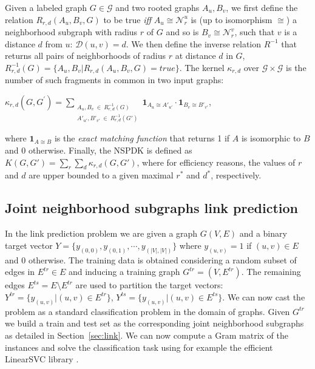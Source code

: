 \documentclass[runningheads,a4paper]{llncs}
\begin{document}
Given a labeled graph $G \in \mathcal{G}$ and two rooted graphs $A_u, B_v$, we first define the relation $R_{r,d}(A_u, B_v, G)$ to be true {\em iff} $A_u \cong \mathcal{N}_r^u$ is (up to isomorphism $\cong$) a neighborhood subgraph with radius $r$ of $G$ and so is $B_v \cong  \mathcal{N}_r^v$, such that $v$ is a distance $d$ from $u$: $\mathcal{D}(u,v)= d$. We then define the inverse relation $R^{-1}$ that returns all pairs of neighborhoods of radius $r$ at distance $d$ in $G$, $R^{-1}_{r,d}(G) = \lbrace A_u, B_v | R_{r,d}(A_u,B_v,G)=true\rbrace$. The kernel $\kappa_{r,d}$ over $\mathcal{G} \times \mathcal{G}$ is the number of such fragments in common in two input graphs:
\begin{center}
$\kappa_{r,d}(G,G^{'}) = 
\!\!\!\!\!\!\!\!\!\!\!\! 
\sum\limits_{\substack{A_u, B_v \ \in \ R_{r,d}^{-1}(G) \\ 
{A'}_{u'}, {B'}_{v'} \ \in \ R_{r,d}^{-1}(G')
}} \!\!\!\!\!\!\!\!\!\!\!\!  { { \textbf{1}_{A_{u} \cong A'_{u'}}} \cdot {
\textbf{1}_{B_{v} \cong B'_{v'}}} }$, 
\end{center}
\noindent where $\textbf{1}_{A \cong B}$ is the \textit{exact matching function} that returns 1 if $A$ is isomorphic to $B$ and 0 otherwise. Finally, the NSPDK is defined as $K(G,G') = \sum\limits_{r}{\sum\limits_{d}{\kappa_{r,d}(G,G')}}$, where for efficiency reasons, the values of $r$ and $d$ are upper bounded to a given maximal $r^*$ and $d^*$, respectively.


\subsection{Joint neighborhood subgraphs link prediction}

In the link prediction problem we are given a graph $G(V,E)$ and a binary target vector $Y=\{y_{(0,0)},y_{(0,1)}, \cdots, y_{(|V|,|V|)}\}$ where $y_{(u,v)}=1$ if $(u,v) \in E$ and 0 otherwise. The training data is obtained considering a random subset of edges in $E^{tr} \in E$ and inducing a training graph $G^{tr}=(V,E^{tr})$. The remaining edges $E^{ts} = E \setminus E^{tr}$ are used to partition the target vectors: $Y^{tr} = \{y_{(u,v)} | (u,v) \in E^{tr}\}$, $Y^{ts} = \{y_{(u,v)} | (u,v) \in E^{ts}\}$.
We can now cast the problem as a standard classification problem in the domain of graphs. Given $G^{tr}$ we build a train and test set as the corresponding joint neighborhood subgraphs as detailed in Section~\ref{sec:link}. 
We can now compute a Gram matrix of the instances and solve the classification task using for example the efficient LinearSVC library \cite{svm}.
\end{document}

